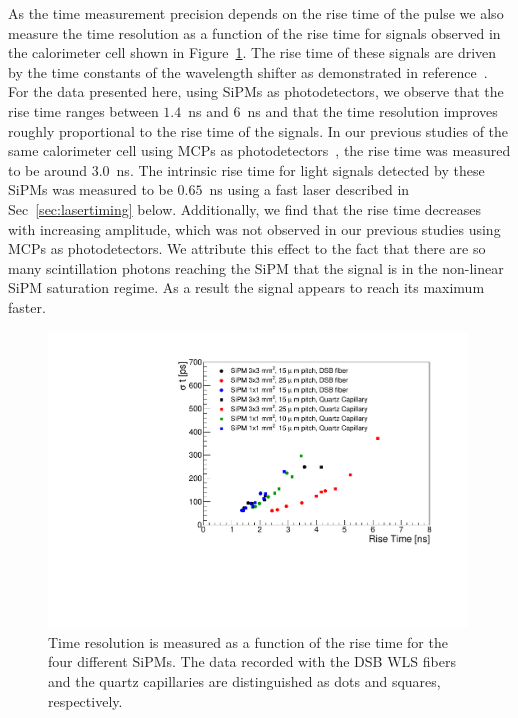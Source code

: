 As the time measurement precision depends on the rise time of the pulse we also
measure the time resolution as a function of the rise time for signals observed
in the calorimeter cell shown in Figure~\ref{RiseTime}. The rise time of these
signals are driven by the time constants of the wavelength shifter as
demonstrated in reference~\cite{Anderson:2015gha}. For the data presented here,
using SiPMs as photodetectors, we observe that the rise time ranges between
$1.4$~ns and $6$~ns and that the time resolution improves roughly proportional
to the rise time of the signals. In our previous studies of the same calorimeter 
cell using MCPs as photodetectors~\cite{Anderson:2015gha}, the rise time was measured to be around 
$3.0$~ns. The intrinsic rise time for light signals detected by these SiPMs was
measured to be $0.65$~ns using a fast laser described in Sec~\ref{sec:lasertiming} below. 
Additionally, we find that the rise time decreases with increasing amplitude, which was
not observed in our previous studies using MCPs as photodetectors. We attribute 
this effect to the fact that there are so many scintillation photons reaching the SiPM that
the signal is in the non-linear SiPM saturation regime. As a result the signal 
appears to reach its maximum faster. 

\begin{figure}[!htb]
\centering
\includegraphics[width=0.99\textwidth]{figures/ShashlikTimeResolutionVsRiseTime.pdf}
\caption{\label{RiseTime}Time resolution is measured as a function of the rise time
for the four different SiPMs. The data recorded with the DSB WLS fibers and the
quartz capillaries are distinguished as dots and squares, respectively. }
\end{figure}

